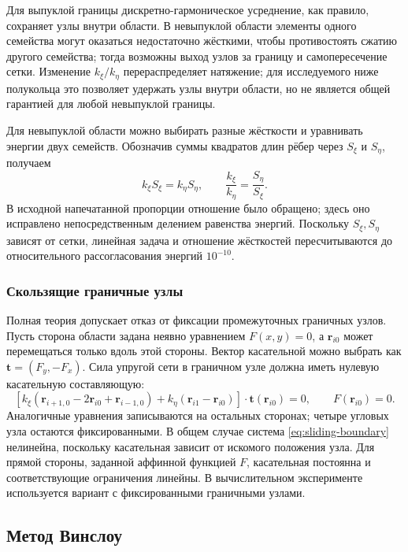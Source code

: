 \documentclass[11pt,a4paper]{article}
\newcommand{\vect}[1]{\boldsymbol{#1}}
\begin{document}
Для выпуклой границы дискретно-гармоническое усреднение, как правило,
сохраняет узлы внутри области. В невыпуклой области элементы одного
семейства могут оказаться недостаточно жёсткими, чтобы противостоять
сжатию другого семейства; тогда возможны выход узлов за границу и
самопересечение сетки. Изменение \(k_\xi/k_\eta\) перераспределяет
натяжение; для исследуемого ниже полукольца это позволяет удержать узлы
внутри области, но не является общей гарантией для любой невыпуклой
границы.

Для невыпуклой области можно выбирать разные жёсткости и уравнивать
энергии двух семейств. Обозначив суммы квадратов длин рёбер через
\(S_\xi\) и \(S_\eta\), получаем
\[
 k_\xi S_\xi=k_\eta S_\eta,\qquad
 \frac{k_\xi}{k_\eta}=\frac{S_\eta}{S_\xi}.
\]
В исходной напечатанной пропорции отношение было обращено; здесь оно
исправлено непосредственным делением равенства энергий. Поскольку
\(S_\xi,S_\eta\) зависят от сетки, линейная задача и отношение жёсткостей
пересчитываются до относительного рассогласования энергий \(10^{-10}\).

\subsubsection{Скользящие граничные узлы}

Полная теория допускает отказ от фиксации промежуточных граничных узлов.
Пусть сторона области задана неявно уравнением \(F(x,y)=0\), а
\(\vect r_{i0}\) может перемещаться только вдоль этой стороны. Вектор
касательной можно выбрать как
\(\vect t=(F_y,-F_x)\). Сила упругой сети в граничном узле должна иметь
нулевую касательную составляющую:
\begin{equation}
\left[
k_\xi(\vect r_{i+1,0}-2\vect r_{i0}+\vect r_{i-1,0})
+k_\eta(\vect r_{i1}-\vect r_{i0})
\right]\cdot\vect t(\vect r_{i0})=0,
\qquad F(\vect r_{i0})=0.
\label{eq:sliding-boundary}
\end{equation}
Аналогичные уравнения записываются на остальных сторонах; четыре
угловых узла остаются фиксированными. В общем случае система
\eqref{eq:sliding-boundary} нелинейна, поскольку касательная зависит от
искомого положения узла. Для прямой стороны, заданной аффинной функцией
\(F\), касательная постоянна и соответствующие ограничения линейны. В
вычислительном эксперименте используется вариант с фиксированными
граничными узлами.

\subsection{Метод Винслоу}
\end{document}
